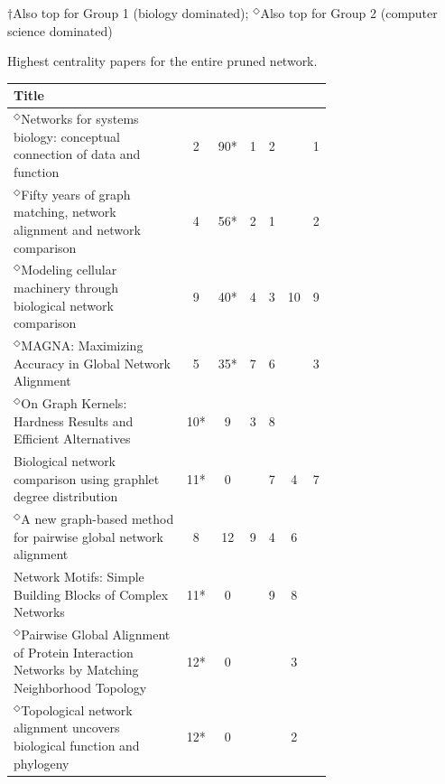 \documentclass[12pt]{thesis}
\theoremstyle{plain}
\theoremstyle{definition}
\theoremstyle{remark}
\begin{document}
\begin{table}[H]
{\vspace{-.03cm}
$\dagger$Also top for Group 1 (biology dominated); $^\Diamond$Also top for Group 2 (computer science dominated)
}
\vspace{-.25cm}
\caption{Highest centrality papers for the entire pruned network.}
\label{tab:toppapers_all}
\end{table}

\begin{table}[H]
{\fontsize{10}{13}\selectfont
\begin{tabular}{|L{0.7\linewidth}|c|c|c|c|c|c|}
\hline
Title &  &   &  &   &   &  \\ \hline\hline
$^\Diamond$Networks for systems biology: conceptual connection of data and function  \cite{Emmert_Streib_2011} & 2 & 90* & 1 & 2 &  & 1 \\ \hline
$^\Diamond$Fifty years of graph matching, network alignment and network comparison  \cite{Emmert_Streib_2016} & 4 & 56* & 2 & 1 &  & 2 \\ \hline
$^\Diamond$Modeling cellular machinery through biological network comparison  \cite{Sharan_2006} & 9 & 40* & 4 & 3 & 10 & 9 \\ \hline
$^\Diamond$MAGNA: Maximizing Accuracy in Global Network Alignment  \cite{Saraph_2014} & 5 & 35* & 7 & 6 &  & 3 \\ \hline
$^\Diamond$On Graph Kernels: Hardness Results and Efficient Alternatives  \cite{Gartner_2003} & 10* & 9 & 3 & 8 &  &  \\ \hline
Biological network comparison using graphlet degree distribution  \cite{Przulj_2007} & 11* & 0 &  & 7 & 4 & 7 \\ \hline
$^\Diamond$A new graph-based method for pairwise global network alignment  \cite{Klau_2009} & 8 & 12 & 9 & 4 & 6 &  \\ \hline
Network Motifs: Simple Building Blocks of Complex Networks  \cite{Milo_2002} & 11* & 0 &  & 9 & 8 &  \\ \hline
$^\Diamond$Pairwise Global Alignment of Protein Interaction Networks by Matching Neighborhood Topology  \cite{Singh_2007} & 12* & 0 &  &  & 3 &  \\ \hline
$^\Diamond$Topological network alignment uncovers biological function and phylogeny  \cite{Kuchaiev_2010} & 12* & 0 &  &  & 2 &  \\ \hline

\end{tabular}}
\end{table}
\end{document}
